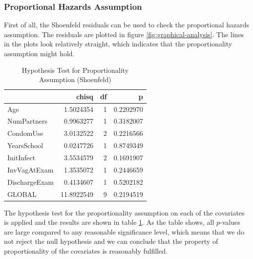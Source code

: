 \documentclass[
]{article}
\begin{document}
\hypertarget{proportional-hazards-assumption}{%
\subsubsection{Proportional Hazards Assumption}\label{proportional-hazards-assumption}}

First of all, the Shoenfeld residuals can be used to check the proportional hazards assumption. The residuals are plotted in figure \ref{fig:graphical-analysis}. The lines in the plots look relatively straight, which indicates that the proportionality assumption might hold.

\begin{table}

\caption{\label{tab:schoenfeld-table}Hypothesis Test for Proportionality Assumption (Shoenfeld)}
\centering
\begin{tabular}[t]{l|r|r|r}
\hline
  & chisq & df & p\\
\hline
Age & 1.5024354 & 1 & 0.2202970\\
\hline
NumPartners & 0.9963277 & 1 & 0.3182007\\
\hline
CondomUse & 3.0132522 & 2 & 0.2216566\\
\hline
YearsSchool & 0.0247726 & 1 & 0.8749349\\
\hline
InitInfect & 3.5534579 & 2 & 0.1691907\\
\hline
InvVagAtExam & 1.3535072 & 1 & 0.2446659\\
\hline
DischargeExam & 0.4134607 & 1 & 0.5202182\\
\hline
GLOBAL & 11.8922549 & 9 & 0.2194519\\
\hline
\end{tabular}
\end{table}

The hypothesis test for the proportionality assumption on each of the covariates is applied and the results are shown in table \ref{tab:schoenfeld-table}. As the table shows, all \(p\)-values are large compared to any reasonable significance level, which means that we do not reject the null hypothesis and we can conclude that the property of proportionality of the covariates is reasonably fulfilled.
\end{document}
